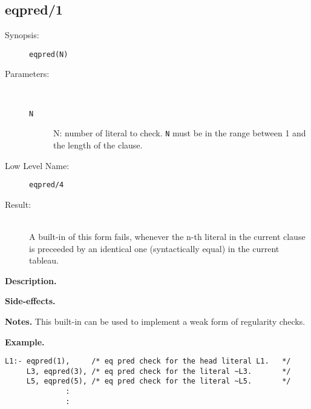 %
%
%
\subsection{eqpred/1}

\begin{description}
\item[Synopsis:]
	{\tt eqpred(N)}
\item[Parameters:]\ \\[-0.5cm]
	\begin{description}
	\item[{\tt N}]
	N: number of literal to check. {\tt N} must be in the range
        between 1 and the length of the clause.
	\end{description}
\item[Low Level Name:]
	{\tt eqpred/4}
\item[Result:]\ \\
A built-in of this form fails, whenever the
            n-th literal in the current clause is preceeded by an
            identical one (syntactically equal) in the current tableau.
\end{description}

\vspace*{0.5cm}
\noindent
{\bf Description.}

\vspace*{0.5cm}
\noindent
{\bf Side-effects.}

\vspace*{0.5cm}
\noindent
{\bf Notes.}
This built-in can be used to implement a weak form of
regularity checks.

\vspace*{0.5cm}
\noindent
{\bf Example.}
\begin{verbatim}
L1:- eqpred(1),     /* eq pred check for the head literal L1.   */
     L3, eqpred(3), /* eq pred check for the literal ~L3.       */
     L5, eqpred(5), /* eq pred check for the literal ~L5.       */
              :
              :

\end{verbatim}


